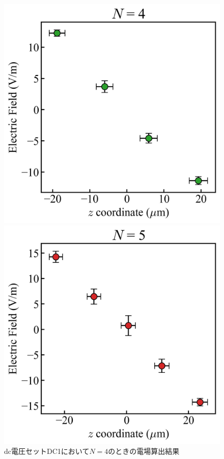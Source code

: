 \begin{figure}[h]
	\begin{minipage}{0.33\linewidth}
		\begin{center}
			\includegraphics[width = 0.9\columnwidth]{./results/figure/DC1_N4.jpg}
			\caption{dc電圧セットDC1において$N=4$のときの電場算出結果}
			\label{fig:DC1_N4}
		\end{center}
	\end{minipage}
	\begin{minipage}{0.33\linewidth}
		\begin{center}
			\includegraphics[width = 0.9\columnwidth]{./results/figure/DC1_N5.jpg}

\end{center}
\end{minipage}
\end{figure}

